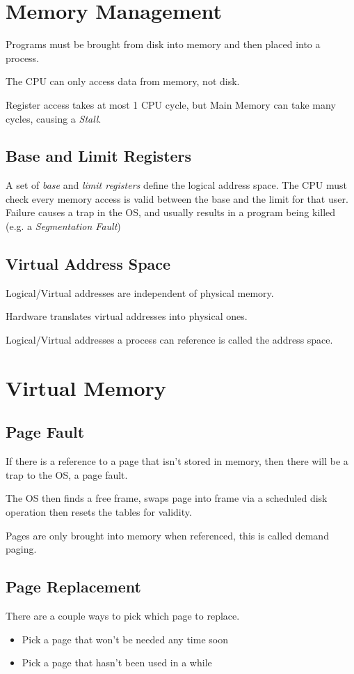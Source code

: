 \documentclass[a4]{article}
\begin{document}
\section{Memory Management}
Programs must be brought from disk into memory and then placed into a process.

The CPU can only access data from memory, not disk.

Register access takes at most 1 CPU cycle, but Main Memory can take many cycles, causing a \emph{Stall}.

\subsection{Base and Limit Registers}
A set of \emph{base} and \emph{limit registers} define the logical address space. The CPU must check every
memory access is valid between the base and the limit for that user. Failure causes a trap in the OS, and usually results in a program being killed (e.g. a \emph{Segmentation Fault})

\subsection{Virtual Address Space}
Logical/Virtual addresses are independent of physical memory.

Hardware translates virtual addresses into physical ones.

Logical/Virtual addresses a process can reference is called the address space.




\section{Virtual Memory}

\subsection{Page Fault}
If there is a reference to a page that isn't stored in memory, then there will be a trap to the OS, a page fault.

The OS then finds a free frame, swaps page into frame via a scheduled disk operation then resets the tables for validity.

Pages are only brought into memory when referenced, this is called demand paging.

\subsection{Page Replacement}
There are a couple ways to pick which page to replace.
\begin{itemize}
    \item Pick a page that won't be needed any time soon
    \item Pick a page that hasn't been used in a while
\end{itemize}
\end{document}
